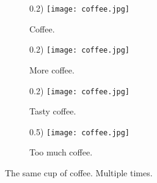 \documentclass{article}
\begin{document}
   \begin{figure}[h!]
	\centering
	\begin{subfigure}[b](0.2\linewidth)
	\texttt{[image: coffee.jpg]}	
	\caption{Coffee.}
	\end{subfigure}	

	\begin{subfigure}[b](0.2\linewidth)
		\texttt{[image: coffee.jpg]}	
		\caption{More coffee.}
	\end{subfigure}	

	\begin{subfigure}[b](0.2\linewidth)
		\texttt{[image: coffee.jpg]}	
		\caption{Tasty coffee.}
	\end{subfigure}

	\begin{subfigure}[b](0.5\linewidth)
		\texttt{[image: coffee.jpg]}	
		\caption{Too much coffee.}
	\end{subfigure}		
    \caption{The same cup of coffee. Multiple times.}
    \label{fig:coffee3}
   \end{figure} 
\end{document}
